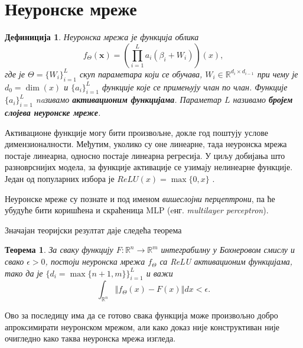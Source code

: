 \documentclass[12pt, a4paper, twoside]{book}
\numberwithin{equation}{chapter}
\newtheorem{theorem}{Теорема}
\numberwithin{theorem}{section}
\newtheorem{definition}{Дефиниција}
\numberwithin{definition}{section}
\numberwithin{definitionChapter}{chapter}
\begin{document}
\section{Неуронске мреже}
%
%

\begin{definition}
	Неуронска мрежа је функција облика
	$$f_{\Theta}(\mathbf{x}) = \left(\prod_{i=1}^{L}a_i(\beta_i + W_i)\right) (x),$$
	где је $\Theta = \{W_i\}_{i=1}^{L}$ скуп параметара који се обучава,
	$W_i \in \mathbb{R}^{d_i \times d_{i-1}}$ при чему је $d_0 = \dim(x)$ и
	$\{a_i\}_{i=1}^{L}$ функције које се примењују члан по члан. Функције
	$\{a_i\}_{i=1}^{L}$ naзивамо \textbf{активационим функцијама}.
	Параметар $L$ називамо \textbf{бројем слојева неуронске мреже}.
\end{definition}
Активационе функције могу бити произвољне, докле год поштују услове димензионалности. Међутим,
уколико су оне линеарне, тада неуронска мрежа постаје линеарна, односно постаје линеарна регресија.
У циљу добијања што разноврснијих модела, за функције активације се узимају нелинеарне функције.
Један од популарних избора је $ReLU(x) = \max\{0, x\}$ \cite{relu}.

Неуронске мреже су познате и под именом \textit{вишеслојни перцептрони}, па ће убудуће бити
коришћена и скраћеница MLP (eнг. \textit{multilayer perceptron}).

Значајан теоријски резултат даје следећа теорема \cite{universal-approx}
\begin{theorem}
	За сваку функцију $F:\mathbb{R}^n \rightarrow \mathbb{R}^m$ интеграбилну у Бохнеровом смислу
	и свако $\epsilon > 0$, постоји неуронска мрежа $f_\Theta$ са ReLU активационим функцијама,
	тако да је $\{d_i=\max\{ n + 1, m\}\}_{i=1}^{L}$ и важи
	$$\int_{\mathbb{R}^n}\left\Vert f_\Theta(x) - F(x) \right\Vert dx < \epsilon.$$
\end{theorem}
Ово за последицу има да се готово свака функција може произвољно добро апроксимирати неуронском
мрежом, али како доказ није конструктиван није очигледно како таква неуронска мрежа изгледа.
\end{document}
